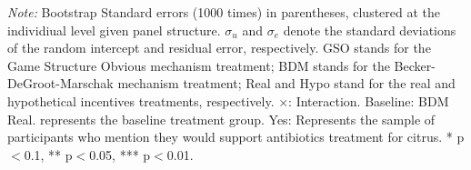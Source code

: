 \documentclass[12pt]{article}
\begin{document}
\begin{table}[H]
\begin{tablenotes}
            \footnotesize
            \item \textit{Note:} Bootstrap Standard errors (1000 times) in parentheses, clustered at the individiual level given panel structure.  $\sigma_u$ and $\sigma_e$ denote the standard deviations of the random intercept and residual error, respectively. GSO stands for the Game Structure Obvious mechanism treatment; BDM stands for the Becker-DeGroot-Marschak mechanism treatment; Real and Hypo stand for the real and hypothetical incentives treatments, respectively. $\times$: Interaction. Baseline: BDM Real. represents the baseline treatment group. Yes: Represents the sample of participants who mention they would support antibiotics treatment for citrus. * p$<$0.1, ** p$<$0.05, *** p$<$0.01.
        \end{tablenotes}
\end{table}

\clearpage
\end{document}
